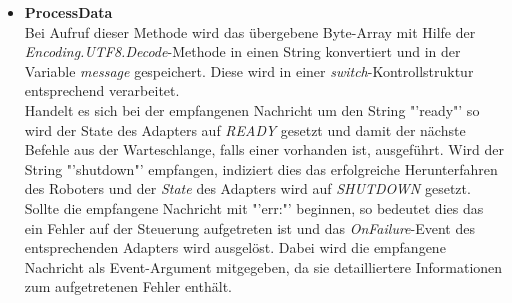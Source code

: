 \begin{itemize}
\item \textbf{ProcessData}\\
Bei Aufruf dieser Methode wird das übergebene Byte-Array mit Hilfe der \textit{Encoding.UTF8.Decode}-Methode in einen String konvertiert und in der Variable \textit{message} gespeichert. Diese wird in einer  \textit{switch}-Kontrollstruktur entsprechend verarbeitet.\\
Handelt es sich bei der empfangenen Nachricht um den String "'ready"' so wird der State des Adapters auf \textit{READY} gesetzt und damit der nächste Befehle aus der Warteschlange, falls einer vorhanden ist, ausgeführt.
Wird der String "'shutdown"' empfangen, indiziert dies das erfolgreiche Herunterfahren des Roboters und der \textit{State} des Adapters wird auf \textit{SHUTDOWN} gesetzt. Sollte die empfangene Nachricht mit "'err:"' beginnen, so bedeutet dies das ein Fehler auf der Steuerung aufgetreten ist und das \textit{OnFailure}-Event des entsprechenden Adapters wird ausgelöst. Dabei wird die empfangene Nachricht als Event-Argument mitgegeben, da sie detailliertere Informationen zum aufgetretenen Fehler enthält.
\end{itemize}
